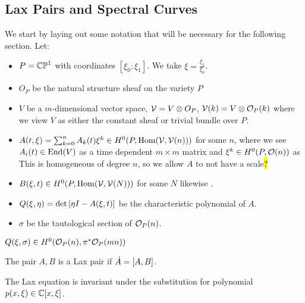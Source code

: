 \documentclass{article}
\begin{document}
\subsection{Lax Pairs and Spectral Curves}
\begin{notation}
	We start by laying out some notation that will be necessary for the following section. Let:
	\begin{itemize}
		\item $P=\mbb{CP}^1$ with coordinates $[\xi_0:\xi_1]$. We take $\xi = \frac{\xi_1}{\xi_0}$. 
		\item $O_P$ be the natural structure sheaf on the variety $P$
		\item $V$ be a $m$-dimensional vector space, $\mc{V} = V \otimes O_P$, $\mc{V}(k) = V \otimes \mc{O}_P(k)$ where we view $V$ as either the constant sheaf or trivial bundle over $P$.
		\item $A(t,\xi) = \sum_{k=0}^n A_k(t) \xi^k \in  H^0(P,\Hom(\mc{V},\mc{V}(n)))$ for some $n$, where we see $A_i(t) \in \End(V)$ as a time dependent $m\times m$ matrix and $\xi^k \in H^0(P,\mc{O}(n))$ as
This is homogeneous of degree $n$, so we allow $A$ to not have a scale\hl{?}
        \item $B(\xi,t) \in  H^0(P,\Hom(\mc{V},\mc{V}(N)))$ for some $N$ likewise . 
        \item $Q(\xi,\eta) = \det\psquare{\eta I - A(\xi,t)}$ be the characteristic polynomial of $A$.
        \item $\sigma$ be the tautological section of $\mc{O}_P(n)$.  
	\end{itemize}
\end{notation}

\begin{lemma}
	$Q(\xi,\sigma) \in H^0(\mc{O}_P(n), \pi^\ast \mc{O}_P(mn))$
\end{lemma}

\begin{definition}
	The pair $A,B$ is a Lax pair if $\dot{A} = \comm[A]{B}$. 
\end{definition}

\begin{prop}
	The Lax equation is invariant under the substitution 
for polynomial $p(x,\xi) \in \mbb{C}[x,\xi]$. 
\end{prop}
\end{document}
